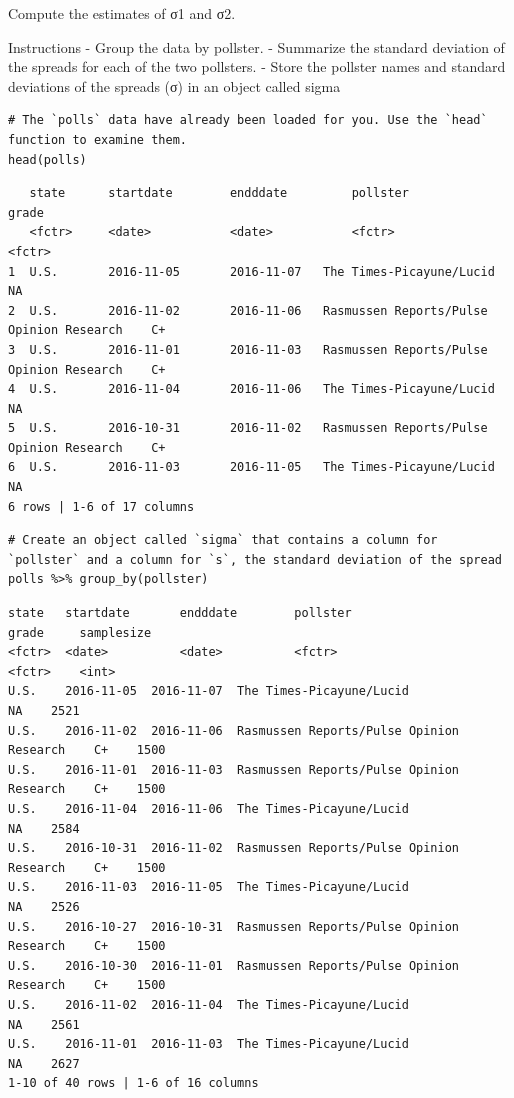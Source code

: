 \documentclass[
]{article}
\begin{document}
Compute the estimates of σ1 and σ2.

Instructions - Group the data by pollster. - Summarize the standard
deviation of the spreads for each of the two pollsters. - Store the
pollster names and standard deviations of the spreads (σ) in an object
called sigma

\begin{verbatim}
# The `polls` data have already been loaded for you. Use the `head` function to examine them.
head(polls)
\end{verbatim}

\begin{verbatim}
   state      startdate        endddate         pollster                                        grade     
   <fctr>     <date>           <date>           <fctr>                                          <fctr>
1  U.S.       2016-11-05       2016-11-07   The Times-Picayune/Lucid                    NA  
2  U.S.       2016-11-02       2016-11-06   Rasmussen Reports/Pulse Opinion Research    C+  
3  U.S.       2016-11-01       2016-11-03   Rasmussen Reports/Pulse Opinion Research    C+  
4  U.S.       2016-11-04       2016-11-06   The Times-Picayune/Lucid                    NA  
5  U.S.       2016-10-31       2016-11-02   Rasmussen Reports/Pulse Opinion Research    C+  
6  U.S.       2016-11-03       2016-11-05   The Times-Picayune/Lucid                    NA  
6 rows | 1-6 of 17 columns
\end{verbatim}

\begin{verbatim}
# Create an object called `sigma` that contains a column for `pollster` and a column for `s`, the standard deviation of the spread
polls %>% group_by(pollster)
\end{verbatim}

\begin{verbatim}
state   startdate       endddate        pollster                                        grade     samplesize   
<fctr>  <date>          <date>          <fctr>                                          <fctr>    <int>
U.S.    2016-11-05  2016-11-07  The Times-Picayune/Lucid                    NA    2521  
U.S.    2016-11-02  2016-11-06  Rasmussen Reports/Pulse Opinion Research    C+    1500  
U.S.    2016-11-01  2016-11-03  Rasmussen Reports/Pulse Opinion Research    C+    1500  
U.S.    2016-11-04  2016-11-06  The Times-Picayune/Lucid                    NA    2584  
U.S.    2016-10-31  2016-11-02  Rasmussen Reports/Pulse Opinion Research    C+    1500  
U.S.    2016-11-03  2016-11-05  The Times-Picayune/Lucid                    NA    2526  
U.S.    2016-10-27  2016-10-31  Rasmussen Reports/Pulse Opinion Research    C+    1500  
U.S.    2016-10-30  2016-11-01  Rasmussen Reports/Pulse Opinion Research    C+    1500  
U.S.    2016-11-02  2016-11-04  The Times-Picayune/Lucid                    NA    2561  
U.S.    2016-11-01  2016-11-03  The Times-Picayune/Lucid                    NA    2627  
1-10 of 40 rows | 1-6 of 16 columns
\end{verbatim}
\end{document}
